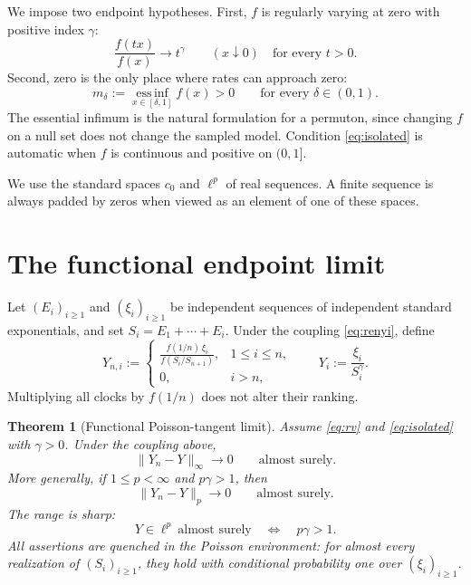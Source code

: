\documentclass[11pt]{article}
\numberwithin{equation}{section}
\newtheorem{theorem}{Theorem}[section]
\theoremstyle{definition}
\theoremstyle{remark}
\newcommand{\essinf}{\operatorname*{ess\,inf}}
\begin{document}
We impose two endpoint hypotheses.  First, $f$ is regularly varying at zero with positive index $\gamma$:
\begin{equation}
  \frac{f(tx)}{f(x)}\longrightarrow t^\gamma
  \qquad (x\downarrow0)
  \quad\text{for every }t>0.
  \label{eq:rv}
\end{equation}
Second, zero is the only place where rates can approach zero:
\begin{equation}
  m_\delta:=\essinf_{x\in[\delta,1]} f(x)>0
  \qquad\text{for every }\delta\in(0,1).
  \label{eq:isolated}
\end{equation}
The essential infimum is the natural formulation for a permuton, since changing $f$ on a null set does not change the sampled model.  Condition \eqref{eq:isolated} is automatic when $f$ is continuous and positive on $(0,1]$.

We use the standard spaces $c_0$ and $\ell^p$ of real sequences.  A finite sequence is always padded by zeros when viewed as an element of one of these spaces.

\section{The functional endpoint limit}
\label{sec:functional}

Let $(E_i)_{i\geq1}$ and $(\xi_i)_{i\geq1}$ be independent sequences of independent standard exponentials, and set $S_i=E_1+\cdots+E_i$.  Under the coupling \eqref{eq:renyi}, define
\begin{equation}
  Y_{n,i}:=
  \begin{cases}
  \displaystyle
  \frac{f(1/n)\,\xi_i}{f(S_i/S_{n+1})},&1\leq i\leq n,\\[1.2ex]
  0,&i>n,
  \end{cases}
  \qquad
  Y_i:=\frac{\xi_i}{S_i^\gamma}.
  \label{eq:Y-definitions}
\end{equation}
Multiplying all clocks by $f(1/n)$ does not alter their ranking.

\begin{theorem}[Functional Poisson-tangent limit]
\label{thm:functional}
Assume \eqref{eq:rv} and \eqref{eq:isolated} with $\gamma>0$.  Under the coupling above,
\begin{equation}
  \|Y_n-Y\|_\infty\longrightarrow0
  \qquad\text{almost surely}.
  \label{eq:c0-convergence}
\end{equation}
More generally, if $1\leq p<\infty$ and $p\gamma>1$, then
\begin{equation}
  \|Y_n-Y\|_p\longrightarrow0
  \qquad\text{almost surely}.
  \label{eq:lp-convergence}
\end{equation}
The range is sharp:
\begin{equation}
  Y\in\ell^p\ \text{almost surely}
  \quad\Longleftrightarrow\quad
  p\gamma>1.
  \label{eq:lp-sharp}
\end{equation}
All assertions are quenched in the Poisson environment: for almost every realization of $(S_i)_{i\geq1}$, they hold with conditional probability one over $(\xi_i)_{i\geq1}$.
\end{theorem}
\end{document}
